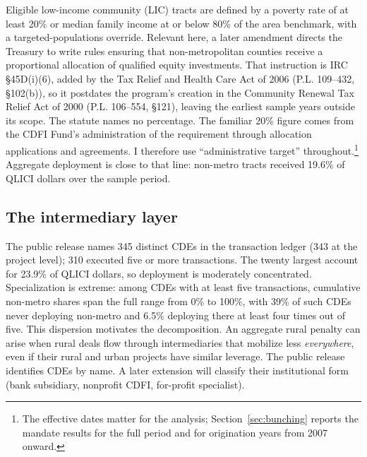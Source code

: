 Eligible low-income community (LIC) tracts are defined by a poverty rate of
at least 20\% or median family income at or below 80\% of the area
benchmark, with a targeted-populations override. Relevant here, a later
amendment directs the Treasury to write rules ensuring that
non-metropolitan counties receive a proportional allocation of qualified
equity investments. That instruction is IRC \S45D(i)(6), added by the Tax
Relief and Health Care Act of 2006 (P.L. 109--432, \S102(b)), so it
postdates the program's creation in the Community Renewal Tax Relief Act of
2000 (P.L. 106--554, \S121), leaving the earliest sample years outside its
scope. The statute names no percentage. The familiar 20\% figure comes
from the CDFI Fund's administration of the requirement through allocation
applications and agreements. I therefore use ``administrative target''
throughout.\footnote{The effective dates matter for the analysis;
Section~\ref{sec:bunching} reports the mandate results for the full period
and for origination years from 2007 onward.} Aggregate deployment is close
to that line: non-metro tracts received 19.6\% of QLICI dollars over the
sample period.

\subsection{The intermediary layer}

The public release names 345 distinct CDEs in the transaction ledger
(343 at the project level); 310 executed five or more transactions. The
twenty largest account for 23.9\% of QLICI dollars, so deployment is
moderately concentrated. Specialization is extreme: among CDEs with at
least five transactions, cumulative non-metro shares span the full range
from 0\% to 100\%, with 39\% of such CDEs never deploying non-metro and
6.5\% deploying there at least four times out of five.
This dispersion motivates the decomposition. An aggregate rural penalty
can arise when rural deals flow through intermediaries that mobilize less
\emph{everywhere}, even if their rural and urban projects have similar
leverage. The public release identifies CDEs by name. A later extension will
classify their institutional form (bank subsidiary, nonprofit CDFI,
for-profit specialist).
